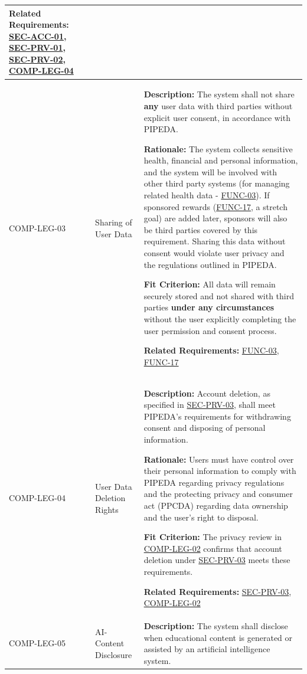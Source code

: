 \documentclass[12pt]{article}
\newcommand{\acr}[3]{\phantomsection\label{acr:#1}#2 (#3)}
\begin{document}
\begin{xltabular}{\textwidth}{|p{2.6cm}|p{3.4cm}|X|}
\textbf{Related Requirements:} \hyperlink{req:SEC-ACC-01}{SEC-ACC-01}, \hyperlink{req:SEC-PRV-01}{SEC-PRV-01}, \hyperlink{req:SEC-PRV-02}{SEC-PRV-02}, \hyperlink{req:COMP-LEG-04}{COMP-LEG-04}\\
\hline

COMP-LEG-03\hypertarget{req:COMP-LEG-03}{} & 
Sharing of User Data & 
\textbf{Description:} The system shall not share \textbf{any} user data with third parties without explicit user consent, in accordance with PIPEDA. 

\textbf{Rationale:} The system collects sensitive health, financial and personal information, and the system will be involved with other third party systems (for managing related health data - \hyperlink{req:FUNC-03}{FUNC-03}). If sponsored rewards (\hyperlink{req:FUNC-17}{FUNC-17}, a stretch goal) are added later, sponsors will also be third parties covered by this requirement. Sharing this data without consent would violate user privacy and the regulations outlined in PIPEDA. 

\textbf{Fit Criterion:} All data will remain securely stored and not shared with third parties \textbf{under any circumstances} without the user explicitly completing the user permission and consent process.

\textbf{Related Requirements:} \hyperlink{req:FUNC-03}{FUNC-03}, \hyperlink{req:FUNC-17}{FUNC-17}\\
\hline

COMP-LEG-04\hypertarget{req:COMP-LEG-04}{} &
User Data Deletion Rights &
\textbf{Description:} Account deletion, as specified in \hyperlink{req:SEC-PRV-03}{SEC-PRV-03}, shall meet PIPEDA's requirements for withdrawing consent and disposing of personal information.

\textbf{Rationale:} Users must have control over their personal information to comply with PIPEDA regarding privacy regulations and the \acr{PPCDA}{protecting privacy and consumer act}{PPCDA} regarding data ownership and the user's right to disposal.

\textbf{Fit Criterion:} The privacy review in \hyperlink{req:COMP-LEG-02}{COMP-LEG-02} confirms that account deletion under \hyperlink{req:SEC-PRV-03}{SEC-PRV-03} meets these requirements.

\textbf{Related Requirements:} \hyperlink{req:SEC-PRV-03}{SEC-PRV-03}, \hyperlink{req:COMP-LEG-02}{COMP-LEG-02}\\
\hline

COMP-LEG-05\hypertarget{req:COMP-LEG-05}{} & 
AI-Content Disclosure & 
\textbf{Description:} The system shall disclose when educational content is generated or assisted by an artificial intelligence system. 


\end{xltabular}
\end{document}
